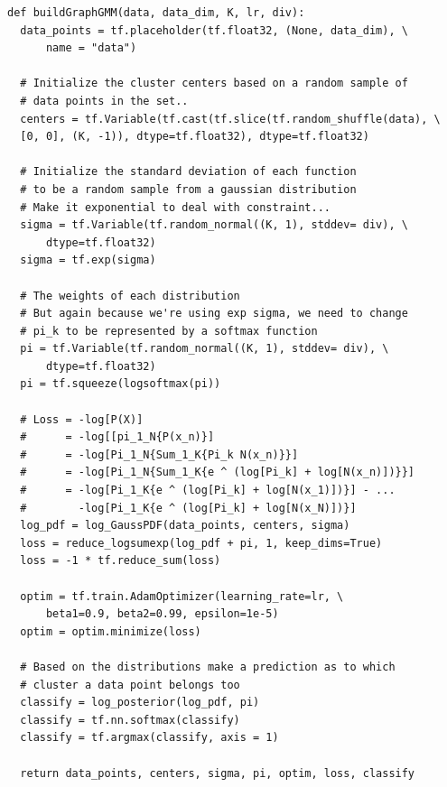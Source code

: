 \documentclass[12pt]{article}
\begin{document}
\begin{verbatim}
def buildGraphGMM(data, data_dim, K, lr, div):
  data_points = tf.placeholder(tf.float32, (None, data_dim), \ 
      name = "data")

  # Initialize the cluster centers based on a random sample of
  # data points in the set..
  centers = tf.Variable(tf.cast(tf.slice(tf.random_shuffle(data), \ 
  [0, 0], (K, -1)), dtype=tf.float32), dtype=tf.float32) 

  # Initialize the standard deviation of each function 
  # to be a random sample from a gaussian distribution
  # Make it exponential to deal with constraint...
  sigma = tf.Variable(tf.random_normal((K, 1), stddev= div), \
      dtype=tf.float32)
  sigma = tf.exp(sigma)

  # The weights of each distribution 
  # But again because we're using exp sigma, we need to change 
  # pi_k to be represented by a softmax function
  pi = tf.Variable(tf.random_normal((K, 1), stddev= div), \
      dtype=tf.float32)
  pi = tf.squeeze(logsoftmax(pi))
  
  # Loss = -log[P(X)] 
  #      = -log[[pi_1_N{P(x_n)}]
  #      = -log[Pi_1_N{Sum_1_K{Pi_k N(x_n)}}]
  #      = -log[Pi_1_N{Sum_1_K{e ^ (log[Pi_k] + log[N(x_n)])}}]
  #      = -log[Pi_1_K{e ^ (log[Pi_k] + log[N(x_1)])}] - ... 
  #        -log[Pi_1_K{e ^ (log[Pi_k] + log[N(x_N)])}]
  log_pdf = log_GaussPDF(data_points, centers, sigma)
  loss = reduce_logsumexp(log_pdf + pi, 1, keep_dims=True)
  loss = -1 * tf.reduce_sum(loss)

  optim = tf.train.AdamOptimizer(learning_rate=lr, \ 
      beta1=0.9, beta2=0.99, epsilon=1e-5)
  optim = optim.minimize(loss)

  # Based on the distributions make a prediction as to which 
  # cluster a data point belongs too
  classify = log_posterior(log_pdf, pi)
  classify = tf.nn.softmax(classify)
  classify = tf.argmax(classify, axis = 1)

  return data_points, centers, sigma, pi, optim, loss, classify
\end{verbatim}
\end{document}
